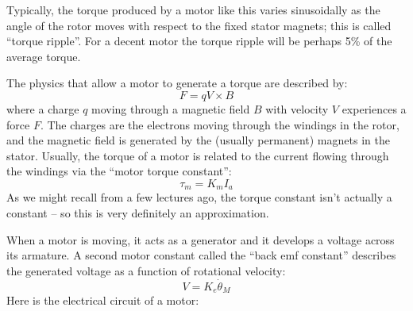 \documentclass[]{article}
\newcommand{\mymotor}[2] %
{\draw[thick,rotate=#2] (#1) circle (10pt)
    node[]{$\mathsf M$} 
    ++(-12pt,3pt)--++(0,-6pt) --++(2.5pt,0) ++(-2.8pt,6pt)-- ++(2.5pt,0pt);
    \draw[thick,rotate=#2] (#1) ++(12pt,3pt)--++(0,-6pt) --++(-2.5pt,0) ++(2.8pt,6pt)-- ++(-2.5pt,0pt);
}
\begin{document}
\noindent
Typically, the torque produced by a motor like this varies sinusoidally as the angle of the rotor moves with respect to the fixed stator magnets; this is called ``torque ripple''. For a decent motor the torque ripple will be perhaps 5\% of the average torque.

\noindent
The physics that allow a motor to generate a torque are described by:
\begin{displaymath}
	F = qV \times B
\end{displaymath}
where a charge $q$ moving through a magnetic field $B$ with velocity $V$ experiences a force $F$. The charges are the electrons moving through the windings in the rotor, and the magnetic field is generated by the (usually permanent) magnets in the stator. Usually, the torque of a motor is related to the current flowing through the windings via the ``motor torque constant'':
\begin{equation}
	\tau_{m} = K_{m}I_{a} \label{torqueconstant}
\end{equation}
As we might recall from a few lectures ago, the torque constant isn't actually a constant -- so this is very definitely an approximation.

\noindent
When a motor is moving, it acts as a generator and it develops a voltage across its armature. A second motor constant called the ``back emf constant'' describes the generated voltage as a function of rotational velocity:
\begin{equation}
	V = K_{e}\dot{\theta}_{M} \label{emfconstant}
\end{equation}
Here is the electrical circuit of a motor:
\begin{figure}[h!]
	\centering
    \label{motor_circuit}
\end{figure}
\end{document}

